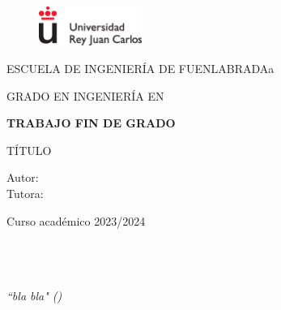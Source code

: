 \documentclass[12pt,a4paper,Spanish]{book}
\begin{document}
\renewcommand{\listtablename}{Índice de tablas} 


\begin{titlepage}
\begin{center}


\begin{figure}
	\centering
\includegraphics[width=0.3\textwidth]{./figs/logoURJC}
\end{figure}

\begin{center}
\large
ESCUELA DE INGENIERÍA DE FUENLABRADAa

\vspace*{0.15in}
GRADO EN INGENIERÍA EN  \\
\vspace*{0.6in}




{\large \bf TRABAJO FIN DE GRADO}\\
\end{center}
\vspace*{0.2in}
{\large
{TÍTULO} \\
}
\vspace*{0.3in}
\vspace*{0.3in}

\vspace*{0.1in}
\end{center}

{\large
Autor:   \\[0.2cm]

Tutora: \\[0.15cm]

}
\vspace*{0.1in}
\vspace*{0.1in}

\begin{center}Curso académico 2023/2024\end{center}



\end{titlepage}
\newpage
$\ $
\thispagestyle{empty} %

\chapter*{}
\begin{flushright}
\textit{“bla bla" ()}

\end{flushright}
\end{document}
